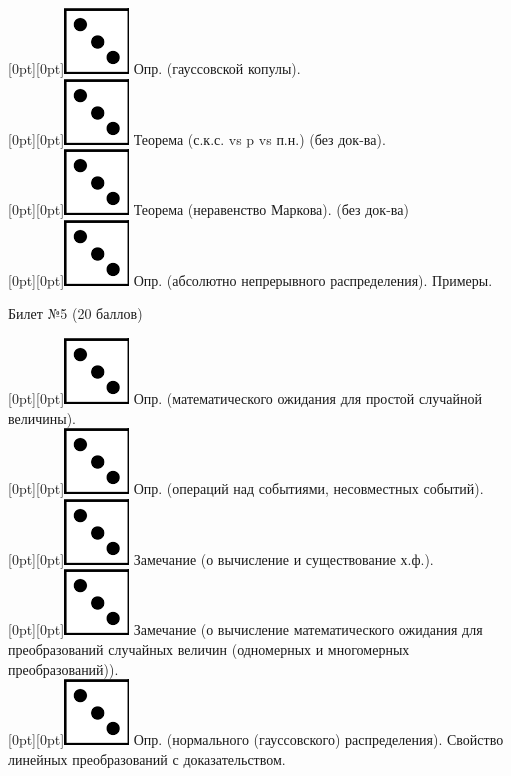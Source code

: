 \documentclass[preview]{standalone}
\begin{document}
\raisebox{-1pt}[0pt][0pt]{\includegraphics[width=0.02\linewidth]{3.png}} Опр. (гауссовской копулы). \\
\raisebox{-1pt}[0pt][0pt]{\includegraphics[width=0.02\linewidth]{3.png}} Теорема (с.к.с. vs p vs п.н.) (без док-ва). \\ 
\raisebox{-1pt}[0pt][0pt]{\includegraphics[width=0.02\linewidth]{3.png}} Теорема (неравенство Маркова). (без док-ва) \\
\raisebox{-1pt}[0pt][0pt]{\includegraphics[width=0.02\linewidth]{3.png}} Опр. (абсолютно непрерывного распределения). Примеры. \\
\begin{center} {\Large Билет №5 (20 баллов)} \end{center}
\raisebox{-1pt}[0pt][0pt]{\includegraphics[width=0.02\linewidth]{3.png}} Опр. (математического ожидания для простой случайной величины). \\
\raisebox{-1pt}[0pt][0pt]{\includegraphics[width=0.02\linewidth]{3.png}} Опр. (операций над событиями, несовместных событий). \\
\raisebox{-1pt}[0pt][0pt]{\includegraphics[width=0.02\linewidth]{3.png}} Замечание (о вычисление и существование х.ф.). \\
\raisebox{-1pt}[0pt][0pt]{\includegraphics[width=0.02\linewidth]{3.png}} Замечание (о вычисление  математического ожидания для преобразований случайных величин (одномерных и многомерных преобразований)). \\
\raisebox{-1pt}[0pt][0pt]{\includegraphics[width=0.02\linewidth]{3.png}}  Опр. (нормального (гауссовского) распределения). Свойство линейных преобразований с доказательством. \\
\end{document}
